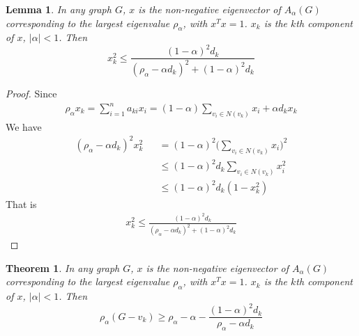 \documentclass[amsthm]{elsart}
\newtheorem{theorem}{Theorem}[section]
\newtheorem{lemma}{Lemma}[section]
\begin{document}
\begin{lemma} \label{lem:3}
In any graph $G$, $x$ is the non-negative eigenvector of $A_\alpha (G)$ corresponding to the largest eigenvalue $\rho _\alpha$, with $x^T x = 1$. $x_k$ is the $k$th component of $x$, $\mid \alpha \mid < 1$. Then \\
\begin{equation} \label{equ:14}
x_k^2 \leqslant \frac{(1 - \alpha)^2 d_k}{(\rho _\alpha - \alpha d_k)^2 + (1 - \alpha)^2 d_k}
\end{equation}
\end{lemma}

\begin{proof}
Since
\begin{eqnarray*}
\rho _\alpha x_k = \sum \limits_{i = 1}^{n} a_{ki} x_i = (1 - \alpha) \sum \limits_{v_i \in N(v_k)}^{} x_i + \alpha d_k x_k
\end{eqnarray*}
We have
\begin{eqnarray*}
 (\rho _\alpha - \alpha d_k)^2 x_k^2 
    &&= (1 - \alpha)^2 \big(\sum \limits_{v_i \in N(v_k)}^{} x_i \big)^2  
    \\ &&\leqslant  (1 - \alpha)^2 d_k \sum \limits_{v_i \in N(v_k)}^{} x_i^2  
    \\ &&\leqslant  (1 - \alpha)^2 d_k (1 - x_k^2)  
\end{eqnarray*}
That is
\begin{eqnarray*}
x_k^2 \leqslant \frac{(1 - \alpha)^2 d_k}{(\rho _\alpha - \alpha d_k)^2 + (1 - \alpha)^2 d_k}
\end{eqnarray*}
\end{proof}

\begin{theorem} \label{the:4}
In any graph $G$, $x$ is the non-negative eigenvector of $A_\alpha (G)$ corresponding to the largest eigenvalue $\rho _\alpha$, with $x^T x = 1$. $x_k$ is the $k$th component of $x$, $\mid \alpha \mid < 1$. Then \\
\begin{equation} \label{equ:16}
\rho _\alpha (G - v_k)
  \geqslant \rho _\alpha - \alpha - \frac{(1 - \alpha)^2 d_k}{\rho _\alpha - \alpha d_k}
\end{equation}
\end{theorem}
\end{document}
